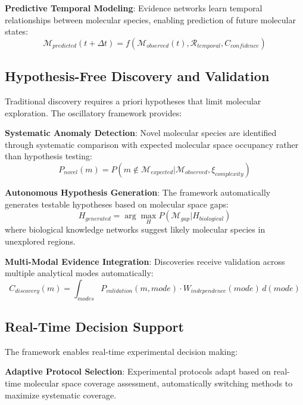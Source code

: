 \documentclass[11pt,a4paper]{article}
\begin{document}
\textbf{Predictive Temporal Modeling}: Evidence networks learn temporal relationships between molecular species, enabling prediction of future molecular states:
\begin{equation}
\mathcal{M}_{predicted}(t+\Delta t) = f(\mathcal{M}_{observed}(t), \mathcal{R}_{temporal}, C_{confidence})
\end{equation}

\subsection{Hypothesis-Free Discovery and Validation}

Traditional discovery requires a priori hypotheses that limit molecular exploration. The oscillatory framework provides:

\textbf{Systematic Anomaly Detection}: Novel molecular species are identified through systematic comparison with expected molecular space occupancy rather than hypothesis testing:
\begin{equation}
P_{novel}(m) = P(m \notin \mathcal{M}_{expected} | \mathcal{M}_{observed}, \xi_{complexity})
\end{equation}

\textbf{Autonomous Hypothesis Generation}: The framework automatically generates testable hypotheses based on molecular space gaps:
\begin{equation}
H_{generated} = \arg\max_H P(\mathcal{M}_{gap} | H_{biological})
\end{equation}
where biological knowledge networks suggest likely molecular species in unexplored regions.

\textbf{Multi-Modal Evidence Integration}: Discoveries receive validation across multiple analytical modes automatically:
\begin{equation}
C_{discovery}(m) = \int_{modes} P_{validation}(m, mode) \cdot W_{independence}(mode) \, d(mode)
\end{equation}

\subsection{Real-Time Decision Support}

The framework enables real-time experimental decision making:

\textbf{Adaptive Protocol Selection}: Experimental protocols adapt based on real-time molecular space coverage assessment, automatically switching methods to maximize systematic coverage.
\end{document}
